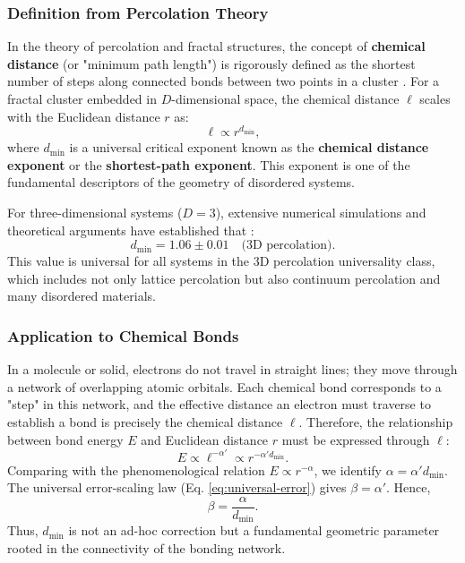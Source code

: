 \documentclass[12pt,a4paper]{article}
\theoremstyle{remark}
\begin{document}
	\subsubsection{Definition from Percolation Theory}
	
	In the theory of percolation and fractal structures, the concept of \textbf{chemical distance} (or "minimum path length") is rigorously defined as the shortest number of steps along connected bonds between two points in a cluster \cite{Stauffer1994, Bunde1996}. For a fractal cluster embedded in \(D\)-dimensional space, the chemical distance \(\ell\) scales with the Euclidean distance \(r\) as:
	\begin{equation}
		\ell \propto r^{d_{\text{min}}},
		\label{eq:chemical_distance}
	\end{equation}
	where \(d_{\text{min}}\) is a universal critical exponent known as the \textbf{chemical distance exponent} or the \textbf{shortest-path exponent}. This exponent is one of the fundamental descriptors of the geometry of disordered systems.
	
	For three-dimensional systems (\(D=3\)), extensive numerical simulations and theoretical arguments have established that \cite{Grassberger1999, Stauffer1994}:
	\begin{equation}
		d_{\text{min}} = 1.06 \pm 0.01 \quad \text{(3D percolation)}.
		\label{eq:dmin_3d_percolation}
	\end{equation}
	This value is universal for all systems in the 3D percolation universality class, which includes not only lattice percolation but also continuum percolation and many disordered materials.
	
	\subsubsection{Application to Chemical Bonds}
	
	In a molecule or solid, electrons do not travel in straight lines; they move through a network of overlapping atomic orbitals. Each chemical bond corresponds to a "step" in this network, and the effective distance an electron must traverse to establish a bond is precisely the chemical distance \(\ell\). Therefore, the relationship between bond energy \(E\) and Euclidean distance \(r\) must be expressed through \(\ell\):
	\begin{equation}
		E \propto \ell^{-\alpha'} \propto r^{-\alpha' d_{\text{min}}}.
		\label{eq:E_through_chemical_distance}
	\end{equation}
	Comparing with the phenomenological relation \(E \propto r^{-\alpha}\), we identify \(\alpha = \alpha' d_{\text{min}}\). The universal error-scaling law (Eq. \ref{eq:universal-error}) gives \(\beta = \alpha'\). Hence,
	\begin{equation}
		\beta = \frac{\alpha}{d_{\text{min}}}.
		\label{eq:beta_from_alpha}
	\end{equation}
	Thus, \(d_{\text{min}}\) is not an ad-hoc correction but a fundamental geometric parameter rooted in the connectivity of the bonding network.
	
\end{document}
